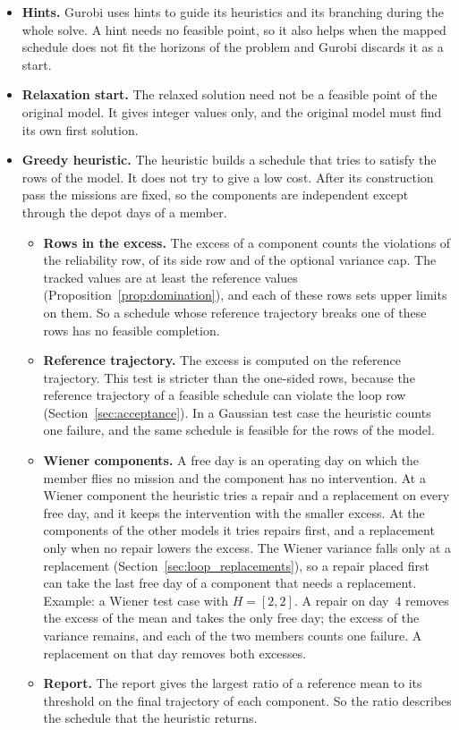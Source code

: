 \documentclass[11pt,a4paper]{article}
\theoremstyle{plain}
\theoremstyle{definition}
\theoremstyle{remark}
\begin{document}
\begin{itemize}
    Its flag \texttt{requested} still shows the request of the source.
  \item \textbf{Hints.} Gurobi uses hints to guide its heuristics and its branching during the whole solve.
    A hint needs no feasible point, so it also helps when the mapped schedule does not fit the horizons of the problem and Gurobi discards it as a start.
  \item \textbf{Relaxation start.} The relaxed solution need not be a feasible point of the original model.
    It gives integer values only, and the original model must find its own first solution.
  \item \textbf{Greedy heuristic.} The heuristic builds a schedule that tries to satisfy the rows of the model.
    It does not try to give a low cost.
    After its construction pass the missions are fixed, so the components are independent except through the depot days of a member.
    \begin{itemize}
      \item \textbf{Rows in the excess.} The excess of a component counts the violations of the reliability row, of its side row and of the optional variance cap.
        The tracked values are at least the reference values (Proposition~\ref{prop:domination}), and each of these rows sets upper limits on them.
        So a schedule whose reference trajectory breaks one of these rows has no feasible completion.
      \item \textbf{Reference trajectory.} The excess is computed on the reference trajectory.
        This test is stricter than the one-sided rows, because the reference trajectory of a feasible schedule can violate the loop row (Section~\ref{sec:acceptance}).
        In a Gaussian test case the heuristic counts one failure, and the same schedule is feasible for the rows of the model.
      \item \textbf{Wiener components.} A free day is an operating day on which the member flies no mission and the component has no intervention.
        At a Wiener component the heuristic tries a repair and a replacement on every free day, and it keeps the intervention with the smaller excess.
        At the components of the other models it tries repairs first, and a replacement only when no repair lowers the excess.
        The Wiener variance falls only at a replacement (Section~\ref{sec:loop_replacements}), so a repair placed first can take the last free day of a component that needs a replacement.
        Example: a Wiener test case with $H = [2, 2]$.
        A repair on day~$4$ removes the excess of the mean and takes the only free day; the excess of the variance remains, and each of the two members counts one failure.
        A replacement on that day removes both excesses.
      \item \textbf{Report.} The report gives the largest ratio of a reference mean to its threshold on the final trajectory of each component.
        So the ratio describes the schedule that the heuristic returns.
    \end{itemize}
\end{itemize}
\end{document}
